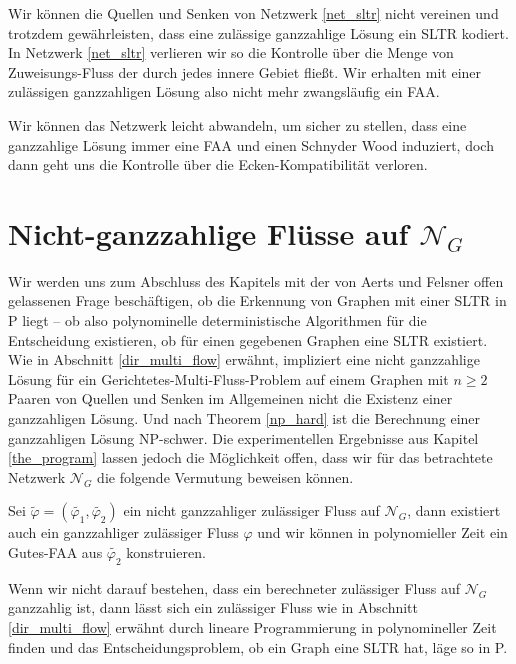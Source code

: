 \begin{remark}
Wir können die Quellen und Senken von Netzwerk \ref{net_sltr} nicht vereinen und trotzdem gewährleisten, dass eine zulässige ganzzahlige Lösung ein SLTR kodiert. In Netzwerk \ref{net_sltr} verlieren wir so die Kontrolle über die Menge von Zuweisungs-Fluss der durch jedes innere Gebiet fließt. Wir erhalten mit einer zulässigen ganzzahligen Lösung also nicht mehr zwangsläufig ein FAA.

Wir können das Netzwerk leicht abwandeln, um sicher zu stellen, dass eine ganzzahlige Lösung immer eine FAA und einen Schnyder Wood induziert, doch dann geht uns die Kontrolle über die Ecken-Kompatibilität verloren.
\end{remark}

\section{Nicht-ganzzahlige Flüsse auf $\mathcal{N}_G$}\label{sec_non_int}

Wir werden uns zum Abschluss des Kapitels mit der von Aerts und Felsner offen gelassenen Frage beschäftigen, ob die Erkennung von Graphen mit einer SLTR in P liegt -- ob also polynominelle deterministische Algorithmen für die Entscheidung existieren, ob für einen gegebenen Graphen eine SLTR existiert. Wie in Abschnitt \ref{dir_multi_flow} erwähnt, impliziert eine nicht ganzzahlige Lösung für ein Gerichtetes-Multi-Fluss-Problem auf einem Graphen mit $n\geq 2$ Paaren von Quellen und Senken im Allgemeinen nicht die Existenz einer ganzzahligen Lösung. Und nach Theorem \ref{np_hard} ist die Berechnung einer ganzzahligen Lösung NP-schwer. Die experimentellen Ergebnisse aus Kapitel \ref{the_program} lassen jedoch die Möglichkeit offen, dass wir für das betrachtete Netzwerk $\mathcal{N}_G$ die folgende Vermutung beweisen können.

\begin{conjecture}\label{int_conj}
Sei $\tilde{\varphi}=(\tilde{\varphi_1},\tilde{\varphi_2})$ ein nicht ganzzahliger zulässiger Fluss auf $\mathcal{N}_G$, dann existiert auch ein ganzzahliger zulässiger Fluss $\varphi$ und wir können in polynomieller Zeit ein Gutes-FAA aus $\tilde{\varphi_2}$ konstruieren.
\end{conjecture}

\begin{remark}
Wenn wir nicht darauf bestehen, dass ein berechneter zulässiger Fluss auf $\mathcal{N}_G$ ganzzahlig ist, dann lässt sich ein zulässiger Fluss wie in Abschnitt \ref{dir_multi_flow} erwähnt durch lineare Programmierung in polynomineller Zeit finden und das Entscheidungsproblem, ob ein Graph eine SLTR hat, läge so in P.
\end{remark}

